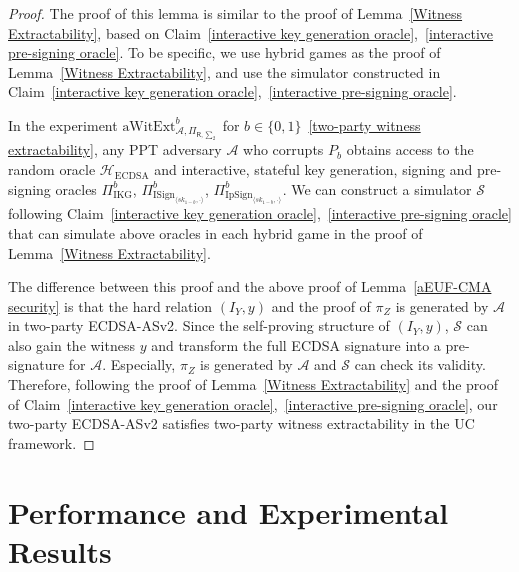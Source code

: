 \documentclass{llncs}
\begin{document}
\begin{proof}
The proof of this lemma is similar to the proof of Lemma~\ref{Witness Extractability}, based on Claim~\ref{interactive key generation oracle},~\ref{interactive pre-signing oracle}. To be specific, we use hybrid games as the proof of Lemma~\ref{Witness Extractability}, and use the simulator constructed in Claim~\ref{interactive key generation oracle},~\ref{interactive pre-signing oracle}. 

In the experiment $\text{aWitExt}^b_{\mathcal{A},\Pi_{\mathsf{R},\sum_2}}$ for $b\in\{0,1\}$~\ref{two-party witness extractability}, any PPT adversary $\mathcal{A}$ who corrupts $P_b$ obtains access to the random oracle $\mathcal{H}_{\text{ECDSA}}$ and interactive, stateful key generation, signing and pre-signing oracles $\Pi^b_{\text{IKG}}$, $\Pi^b_{\text{ISign}_{\langle sk_{1-b},\cdot \rangle}}$, $\Pi^b_{\text{IpSign}_{\langle sk_{1-b},\cdot \rangle}}$. We can construct a simulator $\mathcal{S}$ following Claim~\ref{interactive key generation oracle},~\ref{interactive pre-signing oracle} that can simulate above oracles in each hybrid game in the proof of Lemma~\ref{Witness Extractability}. 

The difference between this proof and the above proof of Lemma~\ref{aEUF-CMA security} is that the hard relation $(I_Y,y)$ and the proof of $\pi_Z$ is generated by $\mathcal{A}$ in two-party ECDSA-ASv2. Since the self-proving structure of $(I_Y,y)$, $\mathcal{S}$ can also gain the witness $y$ and transform the full ECDSA signature into a pre-signature for $\mathcal{A}$. Especially, $\pi_Z$ is generated by $\mathcal{A}$ and $\mathcal{S}$ can check its validity. Therefore, following the proof of Lemma~\ref{Witness Extractability} and the proof of Claim~\ref{interactive key generation oracle},~\ref{interactive pre-signing oracle}, our two-party ECDSA-ASv2 satisfies two-party witness extractability in the UC framework.

\end{proof}




\section{Performance and Experimental Results}
\end{document}
